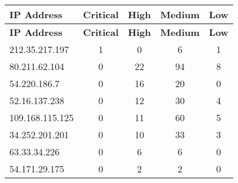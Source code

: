\documentclass{article}
\begin{document}
\begin{longtable}{|>{\raggedright\arraybackslash}p{3cm}|c|c|c|c|}
    \hline
    \textbf{IP Address} & \textbf{Critical} & \textbf{High} & \textbf{Medium} & \textbf{Low} \\
    \hline
    \endfirsthead
    \hline
    \textbf{IP Address} & \textbf{Critical} & \textbf{High} & \textbf{Medium} & \textbf{Low} \\
    \hline
    \endhead
    \hline
    \endfoot
    \endlastfoot
    
    
    
    \rowcolor{lightred} %
    
    212.35.217.197 & 1 & 0 & 6 & 1 \\
    \hline
    
    
    \rowcolor{lightred} %
    
    80.211.62.104 & 0 & 22 & 94 & 8 \\
    \hline
    
    
    \rowcolor{lightred} %
    
    54.220.186.7 & 0 & 16 & 20 & 0 \\
    \hline
    
    
    \rowcolor{lightred} %
    
    52.16.137.238 & 0 & 12 & 30 & 4 \\
    \hline
    
    
    \rowcolor{lightred} %
    
    109.168.115.125 & 0 & 11 & 60 & 5 \\
    \hline
    
    
    \rowcolor{lightred} %
    
    34.252.201.201 & 0 & 10 & 33 & 3 \\
    \hline
    
    
    \rowcolor{lightred} %
    
    63.33.34.226 & 0 & 6 & 6 & 0 \\
    \hline
    
    
    \rowcolor{lightred} %
    
    54.171.29.175 & 0 & 2 & 2 & 0 \\
    \hline
    

\end{longtable}
\end{document}
